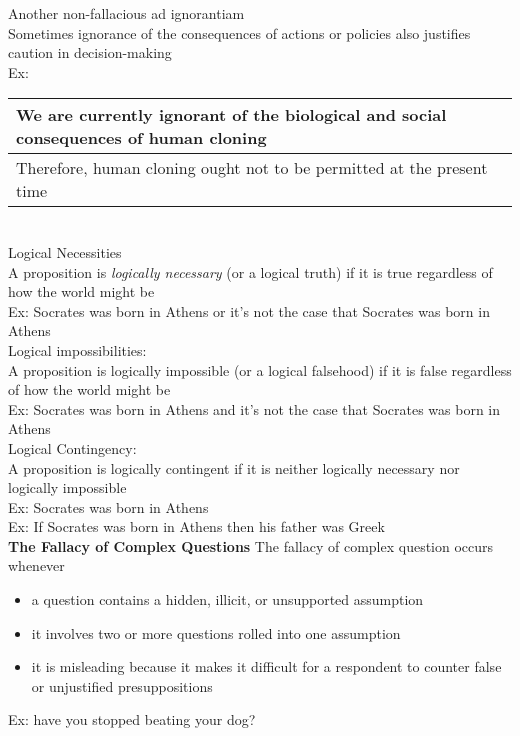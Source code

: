 Another non-fallacious ad ignorantiam\\
Sometimes ignorance of the consequences of actions or policies also justifies caution in decision-making\\
Ex:\\
\begin{tabular}{p{16cm}}
    We are currently ignorant of the biological and social consequences of human cloning\\
    \hline
    Therefore, human cloning ought not to be permitted at the present time
\end{tabular}\\

Logical Necessities\\
A proposition is \textit{logically necessary} (or a logical truth) if it is true regardless of how the world might be\\
Ex: Socrates was born in Athens or it's not the case that Socrates was born in Athens\\

Logical impossibilities:\\
A proposition is logically impossible (or a logical falsehood) if it is false regardless of how the world might be\\
Ex: Socrates was born in Athens and it's not the case that Socrates was born in Athens\\

Logical Contingency:\\
A proposition is logically contingent if it is neither logically necessary nor logically impossible\\
Ex: Socrates was born in Athens\\
Ex: If Socrates was born in Athens then his father was Greek\\

\textbf{The Fallacy of Complex Questions}
The fallacy of complex question occurs whenever
\begin{itemize}
    \item a question contains a hidden, illicit, or unsupported assumption
    \item it involves two or more questions rolled into one assumption
    \item it is misleading because it makes it difficult for a respondent to counter false or unjustified presuppositions
\end{itemize}
Ex: have you stopped beating your dog?\\

